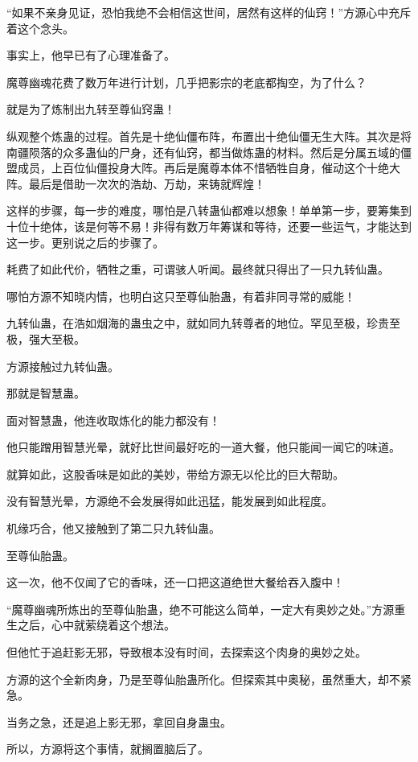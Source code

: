 \begin{this_body}
“如果不亲身见证，恐怕我绝不会相信这世间，居然有这样的仙窍！”方源心中充斥着这个念头。

事实上，他早已有了心理准备了。

魔尊幽魂花费了数万年进行计划，几乎把影宗的老底都掏空，为了什么？

就是为了炼制出九转至尊仙窍蛊！

纵观整个炼蛊的过程。首先是十绝仙僵布阵，布置出十绝仙僵无生大阵。其次是将南疆陨落的众多蛊仙的尸身，还有仙窍，都当做炼蛊的材料。然后是分属五域的僵盟成员，上百位仙僵投身大阵。再后是魔尊本体不惜牺牲自身，催动这个十绝大阵。最后是借助一次次的浩劫、万劫，来铸就辉煌！

这样的步骤，每一步的难度，哪怕是八转蛊仙都难以想象！单单第一步，要筹集到十位十绝体，该是何等不易！非得有数万年筹谋和等待，还要一些运气，才能达到这一步。更别说之后的步骤了。

耗费了如此代价，牺牲之重，可谓骇人听闻。最终就只得出了一只九转仙蛊。

哪怕方源不知晓内情，也明白这只至尊仙胎蛊，有着非同寻常的威能！

九转仙蛊，在浩如烟海的蛊虫之中，就如同九转尊者的地位。罕见至极，珍贵至极，强大至极。

方源接触过九转仙蛊。

那就是智慧蛊。

面对智慧蛊，他连收取炼化的能力都没有！

他只能蹭用智慧光晕，就好比世间最好吃的一道大餐，他只能闻一闻它的味道。

就算如此，这股香味是如此的美妙，带给方源无以伦比的巨大帮助。

没有智慧光晕，方源绝不会发展得如此迅猛，能发展到如此程度。

机缘巧合，他又接触到了第二只九转仙蛊。

至尊仙胎蛊。

这一次，他不仅闻了它的香味，还一口把这道绝世大餐给吞入腹中！

“魔尊幽魂所炼出的至尊仙胎蛊，绝不可能这么简单，一定大有奥妙之处。”方源重生之后，心中就萦绕着这个想法。

但他忙于追赶影无邪，导致根本没有时间，去探索这个肉身的奥妙之处。

方源的这个全新肉身，乃是至尊仙胎蛊所化。但探索其中奥秘，虽然重大，却不紧急。

当务之急，还是追上影无邪，拿回自身蛊虫。

所以，方源将这个事情，就搁置脑后了。


\end{this_body}
